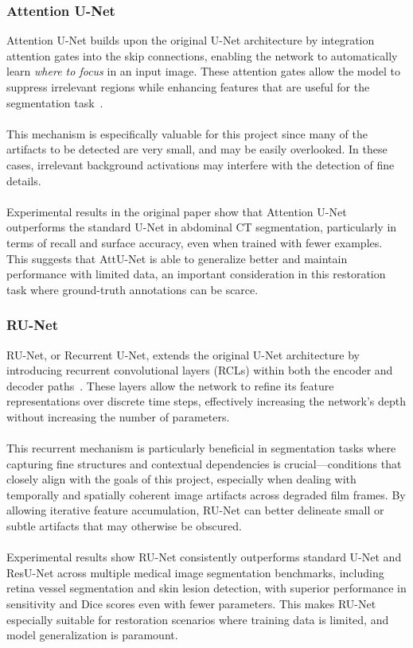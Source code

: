 \documentclass[openany, 12pt]{article}
\begin{document}
{	\subsubsection*{Attention U-Net}
	Attention U-Net builds upon the original U-Net architecture by integration attention gates into the skip connections, enabling the network to automatically learn \textit{where to focus} in an input image. These attention gates allow the model to suppress irrelevant regions while enhancing features that are useful for the segmentation task~\cite{oktay_attention_2018}.\\\\
	This mechanism is especifically valuable for this project since many of the artifacts to be detected are very small, and may be easily overlooked. In these cases, irrelevant background activations may interfere with the detection of fine details. \\\\
	Experimental results in the original paper show that Attention U-Net outperforms the standard U-Net in abdominal CT segmentation, particularly in terms of recall and surface accuracy, even when trained with fewer examples. This suggests that AttU-Net is able to generalize better and maintain performance with limited data, an important consideration in this restoration task where ground-truth annotations can be scarce. 
\subsubsection*{RU-Net} RU-Net, or Recurrent U-Net, extends the original U-Net architecture by introducing recurrent convolutional layers (RCLs) within both the encoder and decoder paths~\cite{alom_recurrent_2018}. These layers allow the network to refine its feature representations over discrete time steps, effectively increasing the network's depth without increasing the number of parameters.\\
\\
This recurrent mechanism is particularly beneficial in segmentation tasks where capturing fine structures and contextual dependencies is crucial—conditions that closely align with the goals of this project, especially when dealing with temporally and spatially coherent image artifacts across degraded film frames. By allowing iterative feature accumulation, RU-Net can better delineate small or subtle artifacts that may otherwise be obscured.\\
\\
Experimental results show RU-Net consistently outperforms standard U-Net and ResU-Net across multiple medical image segmentation benchmarks, including retina vessel segmentation and skin lesion detection, with superior performance in sensitivity and Dice scores even with fewer parameters. This makes RU-Net especially suitable for restoration scenarios where training data is limited, and model generalization is paramount.

}
\end{document}
